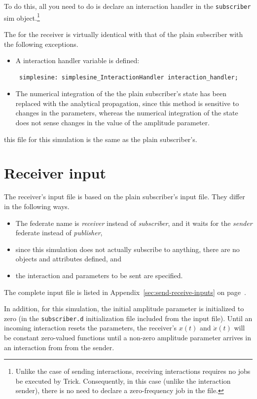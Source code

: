 To do this, all you need to do is declare an interaction handler
in the {\tt subscriber} sim object.\footnote{
  Unlike the case of sending interactions,
  receiving interactions requires no jobs be executed by Trick.
  Consequently, in this case (unlike the interaction sender),
  there is no need to declare a zero-frequency job in the \sdefine file.
}

The \sdefine for the receiver is virtually identical with that of the
plain subscriber with the following exceptions.

\begin{itemize}
\item{
A interaction handler variable is defined:
\begin{verbatim}
 simplesine: simplesine_InteractionHandler interaction_handler;
\end{verbatim}
}
\item{
The numerical integration of the the plain subscriber's state
has been replaced with the analytical propagation, since this
method is sensitive to changes in the parameters, whereas the
numerical integration of the state does not sense changes in the value
of the amplitude parameter.
}
\end{itemize}

this \sdefine file for this simulation is the same as the plain subscriber's.
\section{Receiver input}

The receiver's input file is based on the plain subscriber's input file.
They differ in the following ways.
\begin{itemize}
\item{
  The federate name is {\em receiver} instead of {\em subscriber},
  and it waits for the {\em sender} federate instead of {\em publisher},
}
\item{
  since this simulation does not actually subscribe to anything,
  there are no objects and attributes defined, and
}
\item{
  the interaction and parameters to be sent are specified.
}
\end{itemize}

The complete input file is listed in
Appendix~\ref{sec:send-receive-inputs}
on page~\pageref{sec:complete-receiver-input}.

In addition,
for this simulation, the initial \simplesine amplitude parameter
is initialized to zero
(in the {\tt subscriber.d} initialization file included from the input file).
Until an incoming interaction resets the parameters,
the receiver's $x(t)$ and $\dot{x}(t)$ will be constant zero-valued functions
until a non-zero amplitude parameter arrives in an interaction from
from the sender.

